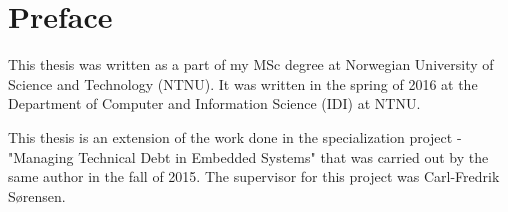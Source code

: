 \section*{\Huge Preface}
This thesis was written as a part of my MSc degree at Norwegian University of Science and Technology (NTNU). It was written in the spring of 2016 at the Department of Computer and Information Science (IDI) at NTNU. 

This thesis is an extension of the work done in the specialization project - "Managing Technical Debt in Embedded Systems" that was carried out by the same author in the fall of 2015. The supervisor for this project was Carl-Fredrik Sørensen.